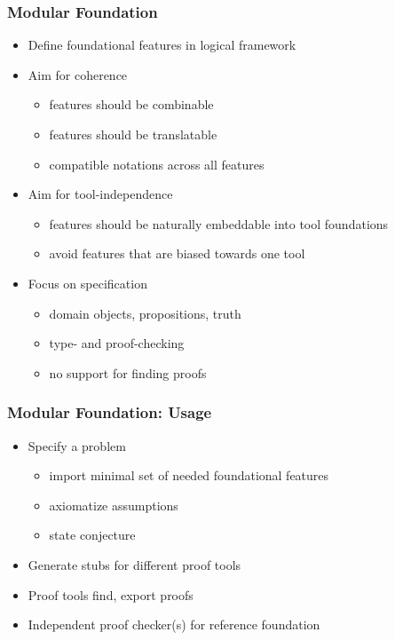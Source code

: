 \documentclass{beamer}
\begin{document}
\begin{frame}\frametitle{Modular Foundation}
\begin{itemize}
\item Define foundational features in logical framework
\item Aim for coherence
 \begin{itemize}
 \item features should be combinable
 \item features should be translatable
 \item compatible notations across all features
 \end{itemize}
\item Aim for tool-independence
 \begin{itemize}
 \item features should be naturally embeddable into tool foundations
 \item avoid features that are biased towards one tool
 \end{itemize}
\item Focus on specification
 \begin{itemize}
 \item domain objects, propositions, truth
 \item type- and proof-checking
 \item no support for finding proofs
 \end{itemize}
\end{itemize}
\end{frame}

\begin{frame}\frametitle{Modular Foundation: Usage}
\begin{itemize}
\item Specify a problem
 \begin{itemize}
 \item import minimal set of needed foundational features
 \item axiomatize assumptions
 \item state conjecture
 \end{itemize}
\item Generate stubs for different proof tools
\item Proof tools find, export proofs
\item Independent proof checker(s) for reference foundation
\end{itemize}
\end{frame}
\end{document}
